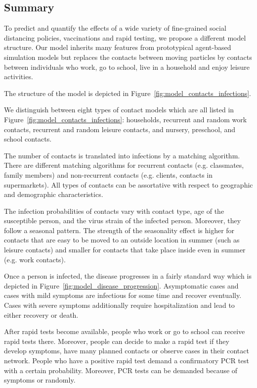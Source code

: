 \subsection{Summary}
\label{sub:model_summary}

To predict and quantify the effects of a wide variety of fine-grained social distancing
policies, vaccinations and rapid testing, we propose a different model structure. Our
model inherits many features from prototypical agent-based simulation models but
replaces the contacts between moving particles by contacts between individuals who work,
go to school, live in a household and enjoy leisure activities.

The structure of the model is depicted in Figure~\ref{fig:model_contacts_infections}.

We distinguish between eight types of contact
models which are all listed in Figure~\ref{fig:model_contacts_infections}: households,
recurrent and random work contacts, recurrent and random leisure contacts, and nursery,
preschool, and school contacts.

The number of contacts is translated into infections by a matching algorithm.
There are different matching algorithms for recurrent contacts (e.g. classmates, family
members) and non-recurrent contacts (e.g. clients, contacts in supermarkets).
All types of contacts can be assortative with respect to geographic and demographic
characteristics.

The infection probabilities of contacts vary with contact type, age of the susceptible
person, and the virus strain of the infected person. Moreover, they follow a seasonal
pattern. The strength of the seasonality effect is higher for contacts that are easy to
be moved to an outside location in summer (such as leisure contacts) and smaller for
contacts that take place inside even in summer (e.g. work contacts).

Once a person is infected, the disease progresses in a fairly standard way which is
depicted in Figure~\ref{fig:model_disease_progression}. Asymptomatic cases and cases with mild
symptoms are infectious for some time and recover eventually. Cases with severe symptoms
additionally require hospitalization and lead to either recovery or death.

After rapid tests become available, people who work or go to school can receive rapid
tests there. Moreover, people can decide to make a rapid test if they develop symptoms,
have many planned contacts or observe
cases in their contact network. People who have a positive rapid test demand a
confirmatory PCR test with a certain probability. Moreover, PCR tests can be demanded
because of symptoms or randomly.

